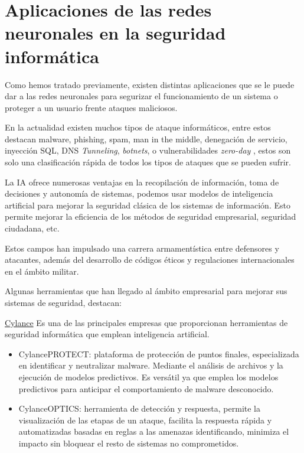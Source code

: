 \section{Aplicaciones de las redes neuronales en la seguridad informática}


Como hemos tratado previamente, existen distintas aplicaciones que se le puede dar a las redes neuronales para segurizar el funcionamiento de un sistema o proteger a un usuario frente ataques maliciosos.

En la actualidad existen muchos tipos de ataque informáticos, entre estos destacan malware, phishing, spam, man in the middle, denegación de servicio, inyección SQL, DNS \textit{Tunneling}, \textit{botnets}, o vulnerabilidades \textit{zero-day} \cite{cisco-attacks}, estos son solo una clasificación rápida de todos los tipos de ataques que se pueden sufrir.

La \gls{IA} ofrece numerosas ventajas en la recopilación de información, toma de decisiones y autonomía de sistemas, podemos usar modelos de inteligencia artificial para mejorar la seguridad clásica de los sistemas de información. Esto permite mejorar la eficiencia de los métodos de seguridad empresarial, seguridad ciudadana, etc.

Estos campos han impulsado una carrera armamentística entre defensores y atacantes, además del desarrollo de códigos éticos y regulaciones internacionales en el ámbito militar.

Algunas herramientas que han llegado al ámbito empresarial para mejorar sus sistemas de seguridad, destacan:

\href{https://cylance.com/}{Cylance} Es una de las principales empresas que proporcionan herramientas de seguridad informática que emplean inteligencia artificial.
\begin{itemize}
    \item CylancePROTECT: plataforma de protección de puntos finales, especializada en identificar y neutralizar malware. Mediante el análisis de archivos y la ejecución de modelos predictivos. Es versátil ya que emplea los modelos predictivos para anticipar el comportamiento de malware desconocido.
    \item CylanceOPTICS: herramienta de detección y respuesta, permite la visualización de las etapas de un ataque, facilita la respuesta rápida y automatizadas basadas en reglas a las amenazas identificando, minimiza el impacto sin bloquear el resto de sistemas no comprometidos.
\end{itemize}

